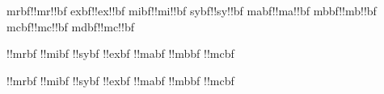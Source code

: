 \unprotect


\chardef\mrbffam\itfam \edef\c!mrbf{\c!mr\c!bf} \let\hexmrbffam\hexitfam %
\chardef\exbffam\slfam \edef\c!exbf{\c!ex\c!bf} \let\hexexbffam\hexslfam %
\chardef\mibffam\bffam \edef\c!mibf{\c!mi\c!bf} \let\hexmibffam\hexbffam %
\chardef\sybffam\nnfam \edef\c!sybf{\c!sy\c!bf} \let\hexsybffam\hexnnfam %
\chardef\mabffam\bsfam \edef\c!mabf{\c!ma\c!bf} \let\hexmabffam\hexbsfam %
\chardef\mbbffam\bifam \edef\c!mbbf{\c!mb\c!bf} \let\hexmbbffam\hexbifam %
\chardef\mcbffam\scfam \edef\c!mcbf{\c!mc\c!bf} \let\hexmcbffam\hexscfam %
\chardef\mdbffam\scfam \edef\c!mdbf{\c!mc\c!bf} \let\hexmdbffam\hexscfam %


\newtoks \boldmathstrategies
\newtoks \boldsymbstrategies

\appendtoks
  \dosetmathfamily\mrbffam\textface\scriptface\scriptscriptface\c!mrbf\mrfallback
  \dosetmathfamily\mibffam\textface\scriptface\scriptscriptface\c!mibf\empty
  \dosetmathfamily\sybffam\textface\scriptface\scriptscriptface\c!sybf\empty
  \dosetmathfamily\exbffam\textface\textface  \textface        \c!exbf\empty
  \dosetmathfamily\mabffam\textface\scriptface\scriptscriptface\c!mabf\empty
  \dosetmathfamily\mbbffam\textface\scriptface\scriptscriptface\c!mbbf\empty
  \dosetmathfamily\mcbffam\textface\scriptface\scriptscriptface\c!mcbf\empty
\to \boldmathstrategies

\appendtoks
  \dosetskewchar\mifam{}
  \dosetskewchar\syfam{}
\to \boldmathstrategies

\appendtoks
  \dosetsymbfamily\mrbffam\textface\scriptface\scriptscriptface\c!mrbf
  \dosetsymbfamily\mibffam\textface\scriptface\scriptscriptface\c!mibf
  \dosetsymbfamily\sybffam\textface\scriptface\scriptscriptface\c!sybf
  \dosetsymbfamily\exbffam\textface\textface  \textface        \c!exbf
  \dosetsymbfamily\mabffam\textface\scriptface\scriptscriptface\c!mabf
  \dosetsymbfamily\mbbffam\textface\scriptface\scriptscriptface\c!mbbf
  \dosetsymbfamily\mcbffam\textface\scriptface\scriptscriptface\c!mcbf
\to \boldsymbstrategies

